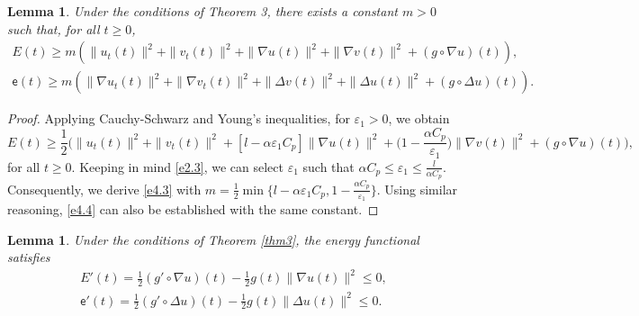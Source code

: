 \documentclass[11pt]{article}
\numberwithin{equation}{section}
\newtheorem{lemma}[theorem]{Lemma}
\begin{document}
\begin{lemma} \label{lem4}
Under the conditions of Theorem 3, there exists a constant $m > 0$
such that, for all $ t \geq 0$,
\begin{gather}
E(t) \geq m \left( \| u_t(t) \|^2 + \| v_t(t) \|^2 + \| \nabla u(t) \|^2
+ \| \nabla v(t) \|^2 + (g \circ \nabla u)(t)\right), \label{e4.3} \\
\mathsf{e}(t) \geq m \left( \| \nabla u_t(t) \|^2+\| \nabla v_t(t) \|^2
+ \| \Delta v(t) \|^2 + \| \Delta u(t) \|^2
+ (g \circ \Delta u)(t)\right) .\label{e4.4}
\end{gather}
\end{lemma}

\begin{proof}
Applying Cauchy-Schwarz and Young's inequalities, for
$ \varepsilon_{1} > 0$, we obtain
\[
E(t) \geq \frac{1}{2} \Big( \| u_t(t) \|^2
 + \| v_t(t) \|^2 + \left[ l -\alpha \varepsilon_{1} C_p \right] \| \nabla u(t) \|^2
 + \big( 1-\frac{\alpha C_p}{\varepsilon_{1}}\big) \| \nabla v(t) \|^2
 + (g \circ \nabla u)(t)\Big),
 \]
 for all $t\geq 0$.
Keeping in mind \eqref{e2.3}, we can select $\varepsilon_{1}$ such that
 $\alpha C_p \leq \varepsilon_{1}\leq \frac{l}{\alpha C_p}$.
Consequently, we derive \eqref{e4.3} with
$ m = \frac{1}{2} \min \{ l -\alpha \varepsilon_{1} C_p,
1-\frac{\alpha C_p }{\varepsilon_{1}} \} $.
Using similar reasoning, \eqref{e4.4} can also be established with the same constant.
\end{proof}

\begin{lemma} \label{lem5}
Under the conditions of Theorem \ref{thm3}, the energy functional satisfies
\begin{gather}
E'(t) = \frac{1}{2} (g' \circ \nabla u)(t) - \frac{1}{2} g(t) \| \nabla u(t) \|^2
 \leq 0, \label{e4.5}\\
\mathsf{e}'(t)= \frac{1}{2}(g' \circ \Delta u)(t)-\frac{1}{2} g(t) \| \Delta u(t) \|^2
\leq 0.\label{e4.6}
\end{gather}
\end{lemma}
\end{document}
